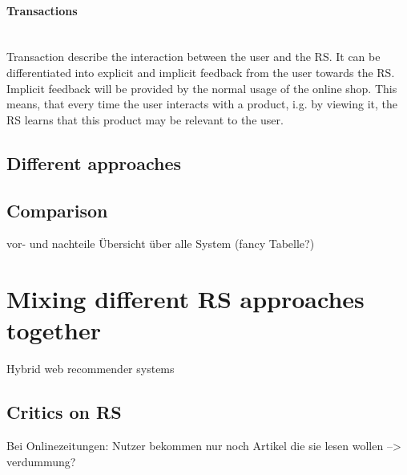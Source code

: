 \paragraph{Transactions}~\\
Transaction describe the interaction between the user and the RS.\citep[p.~9]{ricci:2011}
It can be differentiated into explicit and implicit feedback from the user towards the RS.
Implicit feedback will be provided by the normal usage of the online shop.
This means, that every time the user interacts with a product, i.g. by viewing it, the RS learns that this product may be relevant to the user.\citep{taghipour:2007}




\subsection{Different approaches}
\label{sec:recommenderapproaches}
\iffalse
was fuer welche gibt es
wie unterscheiden sie sich
\fi

\subsection{Comparison}
vor- und nachteile
\"Ubersicht \"uber alle System (fancy Tabelle?)

\section{Mixing different RS approaches together}
Hybrid web recommender systems

\subsection{Critics on RS}
Bei Onlinezeitungen: Nutzer bekommen nur noch Artikel die sie lesen wollen --> verdummung?
